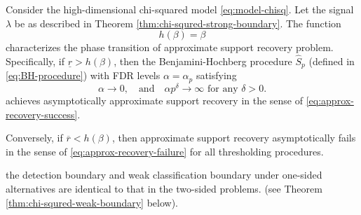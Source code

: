 \begin{theorem} \label{thm:chi-squred-weak-boundary}
Consider the high-dimensional chi-squared model \eqref{eq:model-chisq}.
Let the signal $\lambda$ be as described in Theorem \ref{thm:chi-squred-strong-boundary}.
The function 
\begin{equation} \label{eq:weak-classification-boundary-chisquared}
    h(\beta) = \beta
\end{equation}
characterizes the phase transition of approximate support recovery problem.
Specifically, if $\underline{r} > {h}(\beta)$, then the Benjamini-Hochberg procedure $\widehat{S}_p$ (defined in \eqref{eq:BH-procedure}) with FDR levels $\alpha=\alpha_p$ satisfying
\begin{equation} \label{eq:FDR-rate-to-zero}
    \alpha\to 0,\quad \text{and} \quad \alpha p^\delta\to\infty \text{  for any } \delta>0.
\end{equation}
achieves asymptotically approximate support recovery in the sense of \eqref{eq:approx-recovery-success}. 

Conversely, if $\overline{r} < {h}(\beta)$, then approximate support recovery asymptotically fails in the sense of \eqref{eq:approx-recovery-failure} for all thresholding procedures.
\end{theorem}

\begin{remark}
the detection boundary and weak classification boundary under one-sided alternatives are identical to that in the two-sided problems. (see Theorem \ref{thm:chi-squred-weak-boundary} below).
\end{remark}